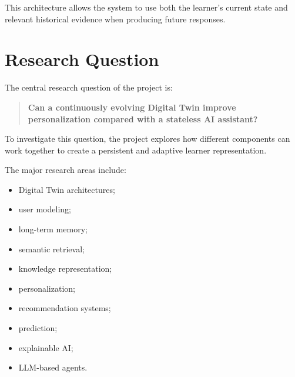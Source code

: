 \documentclass[12pt,a4paper]{article}
\begin{document}
This architecture allows the system to use both the learner's current state and relevant historical evidence when producing future responses.

\section{Research Question}
The central research question of the project is:

\begin{quote}
\textbf{Can a continuously evolving Digital Twin improve personalization compared with a stateless AI assistant?}
\end{quote}

To investigate this question, the project explores how different components can work together to create a persistent and adaptive learner representation.

The major research areas include:
\begin{itemize}[noitemsep,topsep=2pt]
    \item Digital Twin architectures;
    \item user modeling;
    \item long-term memory;
    \item semantic retrieval;
    \item knowledge representation;
    \item personalization;
    \item recommendation systems;
    \item prediction;
    \item explainable AI;
    \item LLM-based agents.
\end{itemize}
\end{document}

